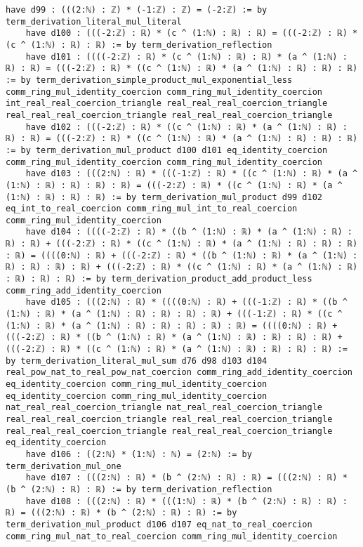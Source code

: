 \documentclass{article}
\begin{document}
\begin{tcolorbox}[colback=white!10, width=\linewidth]
\begin{lstlisting}[language=Lean4]
    have d99 : (((2:ℕ) : ℤ) * (-1:ℤ) : ℤ) = (-2:ℤ) := by term_derivation_literal_mul_literal
    have d100 : (((-2:ℤ) : ℝ) * (c ^ (1:ℕ) : ℝ) : ℝ) = (((-2:ℤ) : ℝ) * (c ^ (1:ℕ) : ℝ) : ℝ) := by term_derivation_reflection
    have d101 : ((((-2:ℤ) : ℝ) * (c ^ (1:ℕ) : ℝ) : ℝ) * (a ^ (1:ℕ) : ℝ) : ℝ) = (((-2:ℤ) : ℝ) * ((c ^ (1:ℕ) : ℝ) * (a ^ (1:ℕ) : ℝ) : ℝ) : ℝ) := by term_derivation_simple_product_mul_exponential_less comm_ring_mul_identity_coercion comm_ring_mul_identity_coercion int_real_real_coercion_triangle real_real_real_coercion_triangle real_real_real_coercion_triangle real_real_real_coercion_triangle
    have d102 : (((-2:ℤ) : ℝ) * ((c ^ (1:ℕ) : ℝ) * (a ^ (1:ℕ) : ℝ) : ℝ) : ℝ) = (((-2:ℤ) : ℝ) * ((c ^ (1:ℕ) : ℝ) * (a ^ (1:ℕ) : ℝ) : ℝ) : ℝ) := by term_derivation_mul_product d100 d101 eq_identity_coercion comm_ring_mul_identity_coercion comm_ring_mul_identity_coercion
    have d103 : (((2:ℕ) : ℝ) * (((-1:ℤ) : ℝ) * ((c ^ (1:ℕ) : ℝ) * (a ^ (1:ℕ) : ℝ) : ℝ) : ℝ) : ℝ) = (((-2:ℤ) : ℝ) * ((c ^ (1:ℕ) : ℝ) * (a ^ (1:ℕ) : ℝ) : ℝ) : ℝ) := by term_derivation_mul_product d99 d102 eq_int_to_real_coercion comm_ring_mul_int_to_real_coercion comm_ring_mul_identity_coercion
    have d104 : ((((-2:ℤ) : ℝ) * ((b ^ (1:ℕ) : ℝ) * (a ^ (1:ℕ) : ℝ) : ℝ) : ℝ) + (((-2:ℤ) : ℝ) * ((c ^ (1:ℕ) : ℝ) * (a ^ (1:ℕ) : ℝ) : ℝ) : ℝ) : ℝ) = ((((0:ℕ) : ℝ) + (((-2:ℤ) : ℝ) * ((b ^ (1:ℕ) : ℝ) * (a ^ (1:ℕ) : ℝ) : ℝ) : ℝ) : ℝ) + (((-2:ℤ) : ℝ) * ((c ^ (1:ℕ) : ℝ) * (a ^ (1:ℕ) : ℝ) : ℝ) : ℝ) : ℝ) := by term_derivation_product_add_product_less comm_ring_add_identity_coercion
    have d105 : (((2:ℕ) : ℝ) * ((((0:ℕ) : ℝ) + (((-1:ℤ) : ℝ) * ((b ^ (1:ℕ) : ℝ) * (a ^ (1:ℕ) : ℝ) : ℝ) : ℝ) : ℝ) + (((-1:ℤ) : ℝ) * ((c ^ (1:ℕ) : ℝ) * (a ^ (1:ℕ) : ℝ) : ℝ) : ℝ) : ℝ) : ℝ) = ((((0:ℕ) : ℝ) + (((-2:ℤ) : ℝ) * ((b ^ (1:ℕ) : ℝ) * (a ^ (1:ℕ) : ℝ) : ℝ) : ℝ) : ℝ) + (((-2:ℤ) : ℝ) * ((c ^ (1:ℕ) : ℝ) * (a ^ (1:ℕ) : ℝ) : ℝ) : ℝ) : ℝ) := by term_derivation_literal_mul_sum d76 d98 d103 d104 real_pow_nat_to_real_pow_nat_coercion comm_ring_add_identity_coercion eq_identity_coercion comm_ring_mul_identity_coercion eq_identity_coercion comm_ring_mul_identity_coercion nat_real_real_coercion_triangle nat_real_real_coercion_triangle real_real_real_coercion_triangle real_real_real_coercion_triangle real_real_real_coercion_triangle real_real_real_coercion_triangle eq_identity_coercion
    have d106 : ((2:ℕ) * (1:ℕ) : ℕ) = (2:ℕ) := by term_derivation_mul_one
    have d107 : (((2:ℕ) : ℝ) * (b ^ (2:ℕ) : ℝ) : ℝ) = (((2:ℕ) : ℝ) * (b ^ (2:ℕ) : ℝ) : ℝ) := by term_derivation_reflection
    have d108 : (((2:ℕ) : ℝ) * (((1:ℕ) : ℝ) * (b ^ (2:ℕ) : ℝ) : ℝ) : ℝ) = (((2:ℕ) : ℝ) * (b ^ (2:ℕ) : ℝ) : ℝ) := by term_derivation_mul_product d106 d107 eq_nat_to_real_coercion comm_ring_mul_nat_to_real_coercion comm_ring_mul_identity_coercion

\end{lstlisting}
\end{tcolorbox}
\end{document}
